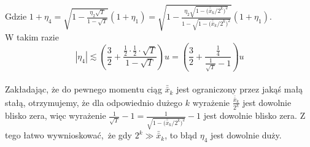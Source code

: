 \documentclass[10pt,wide]{mwart}
\theoremstyle{definition}
\begin{document}
  Gdzie \(1 + \eta_4 = \sqrt{1 - \frac{\eta_2\sqrt{T}}{1 - \sqrt{T}}}(1+\eta_1) = \sqrt{1 - \frac{\eta_2\sqrt{1 - \Big(\bar{\bar{x}}_k/2^k\Big)^2}}{1 - \sqrt{1 - \Big(\bar{\bar{x}}_k/2^k\Big)^2}}}(1+\eta_1) \).\\
  W takim razie $$ |\eta_4| \lesssim (\frac{3}{2} + \frac{\frac{1}{2}\cdot\frac{1}{2}\cdot\sqrt{T}}{1 - \sqrt{T}})u = (\frac{3}{2} + \frac{\frac{1}{4}}{\frac{1}{\sqrt{T}} - 1})u $$ \\
  Zakładając, że do pewnego momentu ciąg \(\bar{\bar{x}}_k\) jest ograniczony przez jakąś małą stałą, otrzymujemy,
  że dla odpowiednio dużego \(k\) wyrażenie \(\frac{\bar{\bar{x}}_k}{2^k}\) jest dowolnie blisko zera,
  więc wyrażenie \(\frac{1}{\sqrt{T}} - 1 = \frac{1}{\sqrt{1 - \Big(\bar{\bar{x}}_k/2^k\Big)^2}} - 1\) jest dowolnie blisko zera.
  Z tego łatwo wywnioskować, że gdy \(2^k \gg \bar{\bar{x}}_k \), to błąd \(\eta_4\) jest dowolnie duży.

\end{document}
